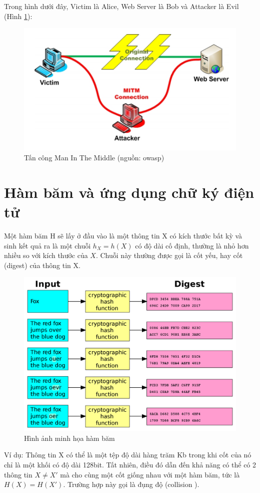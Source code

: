 \documentclass[a4paper,12pt]{report}
\begin{document}
Trong hình dưới đây, Victim là Alice, Web Server là Bob và Attacker là Evil (Hình \ref{sign2}):
\begin{center}
\begin{figure}[H] 
\centering
\includegraphics[width=0.65\linewidth]{../im21.png}
\caption{Tấn công Man In The Middle (nguồn: owasp) } \label{sign2}
\end{figure}
\end{center}
\section{Hàm băm và ứng dụng chữ ký điện tử}
Một hàm băm  H sẽ lấy ở đầu vào là một thông tin X có kích thước bất kỳ và sinh kết quả ra là một chuỗi $h_X=h(X)$ có độ dài cố định, thường là nhỏ hơn nhiều so với kích thước của $X$. Chuỗi này thường được gọi là cốt yếu, hay cốt (digest) của thông tin X.
\begin{center}
\begin{figure}[H]
\centering
\includegraphics[width=0.65\linewidth]{../hash.png}
\caption{Hình ảnh minh họa hàm băm}
\end{figure}
\end{center}

Ví dụ: Thông tin X có thể là một tệp độ dài hàng trăm Kb trong khi cốt của nó chỉ là một khối có độ dài 128bit. Tất nhiên, điều đó dẫn đến khả năng có thể có 2 thông tin $X \neq X'$ mà cho cùng một cốt giống nhau với một hàm băm, tức là $H(X) = H(X')$. Trường hợp này gọi là đụng độ (collision ).
\end{document}

